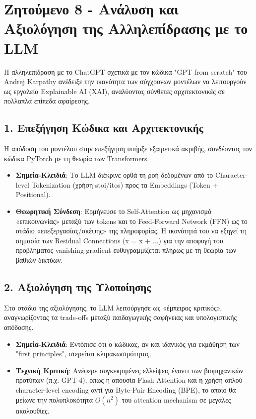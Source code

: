 \section*{Ζητούμενο 8 - Ανάλυση και Αξιολόγηση της Αλληλεπίδρασης με το LLM}
Η αλληλεπίδραση με το ChatGPT σχετικά με τον κώδικα "GPT from scratch" του Andrej Karpathy ανέδειξε την ικανότητα των σύγχρονων μοντέλων να λειτουργούν ως εργαλεία Explainable AI (XAI), αναλύοντας σύνθετες αρχιτεκτονικές σε πολλαπλά επίπεδα αφαίρεσης.

\subsection*{1. Επεξήγηση Κώδικα και Αρχιτεκτονικής}

Η απόδοση του μοντέλου στην επεξήγηση υπήρξε εξαιρετικά ακριβής, συνδέοντας τον κώδικα PyTorch με τη θεωρία των Transformers.

\begin{itemize}
    \item \textbf{Σημεία-Κλειδιά}: Το LLM διέκρινε ορθά τη ροή δεδομένων από το Character-level Tokenization (χρήση stoi/itos) προς τα Embeddings (Token + Positional).
    \item \textbf{Θεωρητική Σύνδεση}: Ερμήνευσε το Self-Attention ως μηχανισμό «επικοινωνίας» μεταξύ των tokens και το Feed-Forward Network (FFN) ως το στάδιο «επεξεργασίας/σκέψης» της πληροφορίας. Η ικανότητά του να εξηγεί τη σημασία των Residual Connections (x = x + ...) για την αποφυγή του προβλήματος vanishing gradient ευθυγραμμίζεται πλήρως με τη θεωρία των βαθιών δικτύων.
\end{itemize}


\subsection*{2. Αξιολόγηση της Υλοποίησης}
Στο στάδιο της αξιολόγησης, το LLM λειτούργησε ως «έμπειρος κριτικός», αναγνωρίζοντας τα trade-offs μεταξύ παιδαγωγικής σαφήνειας και υπολογιστικής απόδοσης.
\begin{itemize}
    \item \textbf{Σημεία-Κλειδιά}: Εντόπισε ότι ο κώδικας, αν και ιδανικός για εκμάθηση των "first principles", στερείται κλιμακωσιμότητας.
    \item \textbf{Τεχνική Κριτική}: Ανέφερε συγκεκριμένες ελλείψεις έναντι των βιομηχανικών προτύπων (π.χ. GPT-4), όπως η απουσία Flash Attention και η χρήση απλού character-level encoding αντί για Byte-Pair Encoding (BPE), το οποίο θα μείωνε την πολυπλοκότητα $O(n^2)$ του attention mechanism σε μεγάλες ακολουθίες.
\end{itemize}


